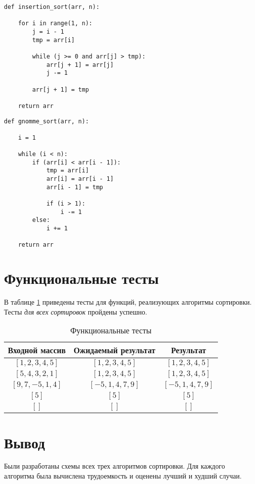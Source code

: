 \begin{center}
\captionsetup{justification=raggedright,singlelinecheck=off}
\begin{lstlisting}[label=lst:insert_sort,caption=Алгоритм сортировки вставками]
    def insertion_sort(arr, n):

    for i in range(1, n):
        j = i - 1
        tmp = arr[i]

        while (j >= 0 and arr[j] > tmp):
            arr[j + 1] = arr[j]
            j -= 1

        arr[j + 1] = tmp

    return arr
\end{lstlisting}
\end{center}


\begin{center}
\captionsetup{justification=raggedright,singlelinecheck=off}
\begin{lstlisting}[label=lst:gnomme_sort,caption=Алгоритм гномьей сортировки]
    def gnomme_sort(arr, n):
    
    i = 1

    while (i < n):
        if (arr[i] < arr[i - 1]):
            tmp = arr[i]
            arr[i] = arr[i - 1]
            arr[i - 1] = tmp

            if (i > 1):
                i -= 1
        else:
            i += 1

    return arr
\end{lstlisting}
\end{center}

\section{Функциональные тесты}

В таблице \ref{tbl:functional_test} приведены тесты для функций, реализующих алгоритмы сортировки. Тесты \textit{для всех сортировок} пройдены успешно.


\begin{table}[h]
	\begin{center}
		\begin{threeparttable}
		\captionsetup{justification=raggedright,singlelinecheck=off}
		\caption{\label{tbl:functional_test} Функциональные тесты}
		\begin{tabular}{|c|c|c|}
			\hline
			Входной массив & Ожидаемый результат & Результат \\ 
			\hline
			$[1, 2, 3, 4, 5]$ & $[1, 2, 3, 4, 5]$  & $[1, 2, 3, 4, 5]$\\
			$[5, 4, 3, 2, 1]$  & $[1, 2, 3, 4, 5]$ & $[1, 2, 3, 4, 5]$\\
			$[9, 7, -5, 1, 4]$  & $[-5, 1, 4, 7, 9]$  & $[-5, 1, 4, 7, 9]$\\
			$[5]$  & $[5]$  & $[5]$\\
			$[]$  & $[]$  & $[]$\\
			\hline
		\end{tabular}
    \end{threeparttable}
	\end{center}
\end{table}


\section*{Вывод}

Были разработаны схемы всех трех алгоритмов сортировки. Для каждого алгоритма была вычислена трудоемкость и оценены лучший и худший случаи.
